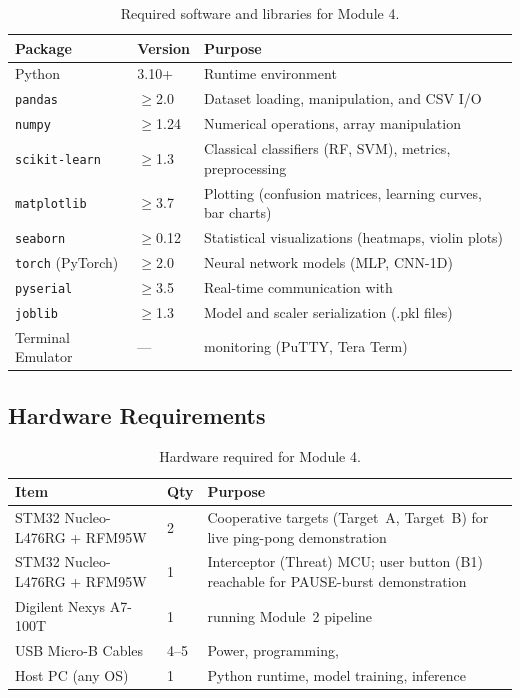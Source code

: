 \documentclass[11pt,letterpaper]{article}
\begin{document}
	\begin{table}[ht!]
		\centering
		\caption{Required software and libraries for Module 4.}
		\label{tab:software}
		\renewcommand{\arraystretch}{1.3}
		\begin{tabularx}{\textwidth}{l l X}
			\toprule
			\textbf{Package} & \textbf{Version} & \textbf{Purpose} \\
			\midrule
			Python & 3.10+ & Runtime environment \\
			\texttt{pandas} & $\geq$2.0 & Dataset loading, manipulation, and CSV I/O \\
			\texttt{numpy} & $\geq$1.24 & Numerical operations, array manipulation \\
			\texttt{scikit-learn} & $\geq$1.3 & Classical classifiers (RF, SVM), metrics, preprocessing \\
			\texttt{matplotlib} & $\geq$3.7 & Plotting (confusion matrices, learning curves, bar charts) \\
			\texttt{seaborn} & $\geq$0.12 & Statistical visualizations (heatmaps, violin plots) \\
			\texttt{torch} (PyTorch) & $\geq$2.0 & Neural network models (MLP, CNN-1D) \\
			\texttt{pyserial} & $\geq$3.5 & Real-time \UART{} communication with \FPGA{} \\
			\texttt{joblib} & $\geq$1.3 & Model and scaler serialization (.pkl files) \\
			Terminal Emulator & --- & \UART{} monitoring (PuTTY, Tera Term) \\
			\bottomrule
		\end{tabularx}
	\end{table}

	\subsection{Hardware Requirements}

	\begin{table}[ht!]
		\centering
		\caption{Hardware required for Module 4.}
		\label{tab:hardware}
		\renewcommand{\arraystretch}{1.3}
		\begin{tabularx}{\textwidth}{l l X}
			\toprule
			\textbf{Item} & \textbf{Qty} & \textbf{Purpose} \\
			\midrule
			STM32 Nucleo-L476RG + RFM95W & 2 & Cooperative targets (Target~A, Target~B) for live ping-pong demonstration \\
			STM32 Nucleo-L476RG + RFM95W & 1 & Interceptor (Threat) MCU; user button (B1) reachable for PAUSE-burst demonstration \\
			Digilent Nexys A7-100T & 1 & \FPGA{} running Module~2 pipeline \\
			USB Micro-B Cables & 4--5 & Power, programming, \UART{} \\
			Host PC (any OS) & 1 & Python runtime, model training, inference \\
			\bottomrule
		\end{tabularx}
	\end{table}
\end{document}
